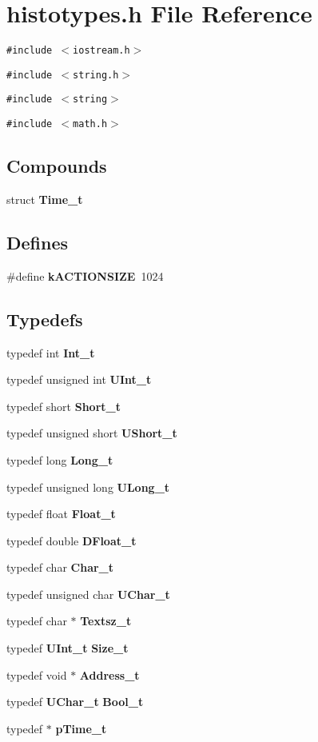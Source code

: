 \section{histotypes.h File Reference}
\label{histotypes_8h}
{\tt \#include $<$iostream.h$>$}\par
{\tt \#include $<$string.h$>$}\par
{\tt \#include $<$string$>$}\par
{\tt \#include $<$math.h$>$}\par
\subsection*{Compounds}
\begin{CompactItemize}
\item 
struct {\bf Time\_\-t}
\end{CompactItemize}
\subsection*{Defines}
\begin{CompactItemize}
\item 
\#define {\bf k\-ACTIONSIZE}\ 1024
\end{CompactItemize}
\subsection*{Typedefs}
\begin{CompactItemize}
\item 
typedef int {\bf Int\_\-t}
\item 
typedef unsigned int {\bf UInt\_\-t}
\item 
typedef short {\bf Short\_\-t}
\item 
typedef unsigned short {\bf UShort\_\-t}
\item 
typedef long {\bf Long\_\-t}
\item 
typedef unsigned long {\bf ULong\_\-t}
\item 
typedef float {\bf Float\_\-t}
\item 
typedef double {\bf DFloat\_\-t}
\item 
typedef char {\bf Char\_\-t}
\item 
typedef unsigned char {\bf UChar\_\-t}
\item 
typedef char $\ast$ {\bf Textsz\_\-t}
\item 
typedef {\bf UInt\_\-t} {\bf Size\_\-t}
\item 
typedef void $\ast$ {\bf Address\_\-t}
\item 
typedef {\bf UChar\_\-t} {\bf Bool\_\-t}
\item 
typedef $\ast$ {\bf p\-Time\_\-t}
\end{CompactItemize}
